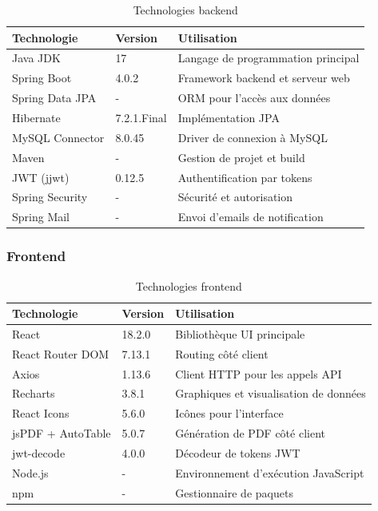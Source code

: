 \documentclass[12pt,a4paper]{report}
\begin{document}
\begin{table}[H]
\centering
\renewcommand{\arraystretch}{1.3}
\begin{tabular}{|l|l|l|}
\hline
\textbf{Technologie} & \textbf{Version} & \textbf{Utilisation} \\
\hline
Java JDK & 17 & Langage de programmation principal \\
\hline
Spring Boot & 4.0.2 & Framework backend et serveur web \\
\hline
Spring Data JPA & - & ORM pour l'accès aux données \\
\hline
Hibernate & 7.2.1.Final & Implémentation JPA \\
\hline
MySQL Connector & 8.0.45 & Driver de connexion à MySQL \\
\hline
Maven & - & Gestion de projet et build \\
\hline
JWT (jjwt) & 0.12.5 & Authentification par tokens \\
\hline
Spring Security & - & Sécurité et autorisation \\
\hline
Spring Mail & - & Envoi d'emails de notification \\
\hline
\end{tabular}
\caption{Technologies backend}
\end{table}

\subsubsection{Frontend}

\begin{table}[H]
\centering
\renewcommand{\arraystretch}{1.3}
\begin{tabular}{|l|l|l|}
\hline
\textbf{Technologie} & \textbf{Version} & \textbf{Utilisation} \\
\hline
React & 18.2.0 & Bibliothèque UI principale \\
\hline
React Router DOM & 7.13.1 & Routing côté client \\
\hline
Axios & 1.13.6 & Client HTTP pour les appels API \\
\hline
Recharts & 3.8.1 & Graphiques et visualisation de données \\
\hline
React Icons & 5.6.0 & Icônes pour l'interface \\
\hline
jsPDF + AutoTable & 5.0.7 & Génération de PDF côté client \\
\hline
jwt-decode & 4.0.0 & Décodeur de tokens JWT \\
\hline
Node.js & - & Environnement d'exécution JavaScript \\
\hline
npm & - & Gestionnaire de paquets \\
\hline
\end{tabular}
\caption{Technologies frontend}
\end{table}
\end{document}
